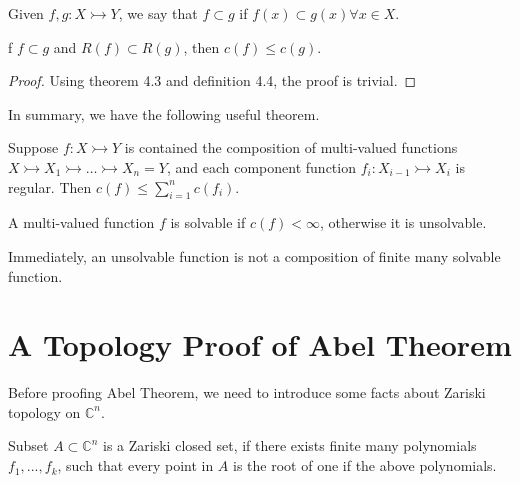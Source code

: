 \documentclass[12pt]{article}
\newcommand{\C}{\mathbb{C}}
\newenvironment{definition}[2][Definition]{\begin{trivlist}
\item[\hskip \labelsep {\bfseries #1}\hskip \labelsep {\bfseries #2.}]}{\end{trivlist}}
\newenvironment{theorem}[2][Theorem]{\begin{trivlist}
\item[\hskip \labelsep {\bfseries #1}\hskip \labelsep {\bfseries #2.}]}{\end{trivlist}}
\begin{document}
\begin{definition}{4.6}
    Given $f,g:X\rightarrowtail Y$, we say that $f\subset g$ if $f(x)\subset g(x)\forall x\in X$.
\end{definition}
\begin{theorem}
    If $f\subset g$ and $R(f)\subset R(g)$, then $c(f)\leq c(g)$.
\end{theorem}
\begin{proof}
    Using theorem 4.3 and definition 4.4, the proof is trivial.
\end{proof}
In summary, we have the following useful theorem.
\begin{theorem}{4.7}
    Suppose $f:X\rightarrowtail Y$ is contained the composition of multi-valued functions $X\rightarrowtail X_1\rightarrowtail \dots\rightarrowtail X_n = Y$, and each component function $f_i:X_{i-1}\rightarrowtail X_{i}$ is regular. Then $c(f)\leq\sum_{i=1}^nc(f_i)$.
\end{theorem}
\begin{definition}{4.8}
    A multi-valued function $f$ is solvable if $c(f)<\infty$, otherwise it is unsolvable.
\end{definition}
Immediately, an unsolvable function is not a composition of finite many solvable function.
\section{A Topology Proof of Abel Theorem}
Before proofing Abel Theorem, we need to introduce some facts about Zariski topology on $\C^n$.
\begin{definition}{5.1}
    Subset $A\subset \C^n$ is a Zariski closed set, if there exists finite many polynomials $f_1,...,f_k$, such that every point in $A$ is the root of one if the above polynomials.
\end{definition}
\end{document}
